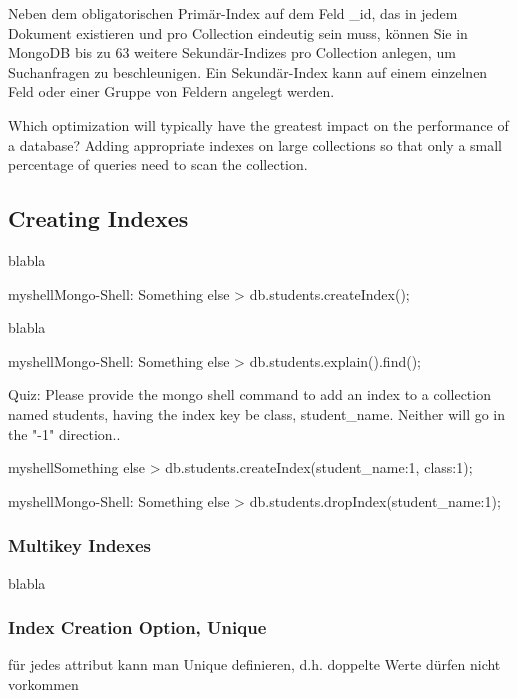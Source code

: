 Neben dem obligatorischen Primär-Index auf dem Feld \_id, das in jedem Dokument existieren und pro Collection eindeutig sein muss, können Sie in MongoDB bis zu 63 weitere Sekundär-Indizes pro Collection anlegen, um Suchanfragen zu beschleunigen. Ein Sekundär-Index kann auf einem einzelnen Feld oder einer Gruppe von Feldern angelegt werden.%

Which optimization will typically have the greatest impact on the performance of a database?\newline
Adding appropriate indexes on large collections so that only a small percentage of queries need to scan the collection.

\subsection{Creating Indexes}
blabla

\begin{listingsboxShell}[label={lst:X}]{myshell}{Mongo-Shell: Something else}
> db.students.createIndex();
\end{listingsboxShell}

blabla

\begin{listingsboxShell}[label={lst:X}]{myshell}{Mongo-Shell: Something else}
> db.students.explain().find();
\end{listingsboxShell}

Quiz: Please provide the mongo shell command to add an index to a collection named students, having the index key be class, student\_name.
Neither will go in the "-1" direction..

\begin{listingsboxShell}[label={lst:X}]{myshell}{Something else}
> db.students.createIndex({student\_name:1, class:1});
\end{listingsboxShell}

\begin{listingsboxShell}[label={lst:X}]{myshell}{Mongo-Shell: Something else}
> db.students.dropIndex({student_name:1});
\end{listingsboxShell}

\subsubsection{Multikey Indexes}
blabla
\subsubsection{Index Creation Option, Unique}
für jedes attribut kann man Unique definieren, d.h. doppelte Werte dürfen nicht vorkommen\newline\newline


